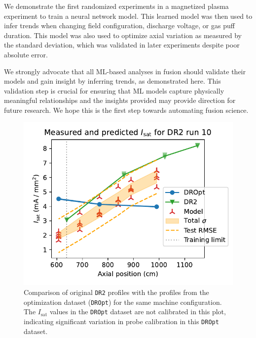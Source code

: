 We demonstrate the first randomized experiments in a magnetized plasma experiment to train a neural network model. This learned model was then used to infer trends when changing field configuration, discharge voltage, or gas puff duration. This model was also used to optimize axial variation as measured by the standard deviation, which was validated in later experiments despite poor absolute error. 

We strongly advocate that all ML-based analyses in fusion should validate their models and gain insight by inferring trends, as demonstrated here. This validation step is crucial for ensuring that ML models capture physically meaningful relationships and the insights provided may provide direction for future research. We hope this is the first step towards automating fusion science.


\begin{figure}
	\includegraphics[width=\textwidth]{figures/DR2-10_LHS-30_valdiation.pdf}
	\caption[size=12]{\label{fig:DR2-10_LHS-30_valdiation}Comparison of original \texttt{DR2} profiles with the profiles from the optimization dataset (\texttt{DROpt}) for the same machine configuration. The $I_\text{sat}$ values in the \texttt{DROpt} dataset are not calibrated in this plot, indicating significant variation in probe calibration in this \texttt{DROpt} dataset.}
\end{figure}

